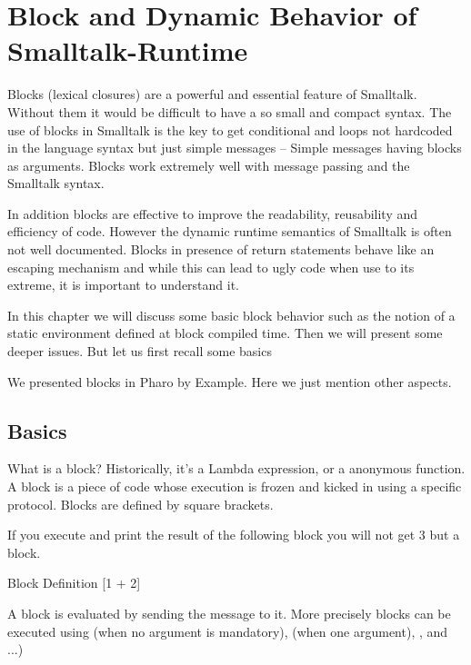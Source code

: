 \documentclass[a4paper,10pt,twoside]{book}
\begin{document}
\fi
\sloppy
\chapter{Block and Dynamic Behavior of Smalltalk-Runtime}



Blocks (lexical closures) are a powerful and essential feature of Smalltalk. Without them it
would be difficult to have a so small and compact syntax. The use of blocks in Smalltalk
is the key to get conditional and loops not hardcoded in the language syntax but just 
simple messages -- Simple messages having blocks as arguments. Blocks work extremely well with message passing and the Smalltalk syntax. 

In addition blocks are  effective to improve the readability, reusability and efficiency of code. 
However the dynamic runtime semantics of Smalltalk is often not well documented. Blocks in presence of
return statements behave like an escaping mechanism and while this can lead to ugly code when use to its extreme, it is important to understand it. 

In this chapter we will discuss some basic block behavior such as the notion of a static environment 
defined at block compiled time. Then we will present some deeper issues. But let us first recall some basics


We presented blocks in Pharo by Example. Here we just mention other aspects. 

\section{Basics}
What is a block? Historically, it's a Lambda expression, or a anonymous function. A block is a piece of code whose execution is frozen and kicked in using a specific protocol.  Blocks are defined by square brackets.

If you execute and print the result of the following block you will not get 3 but a block. 
\begin{code}{Block Definition}
[1 + 2]
\end{code}

 A block is evaluated by sending the  message to it. More precisely blocks can be executed using  (when no argument is mandatory),  (when one argument), ,  and ...)
\end{document}
